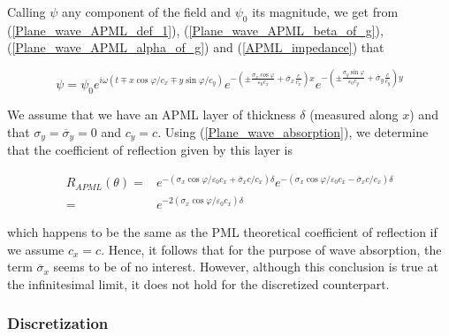 Calling $\psi$ any component of the field and $\psi _{0}$
its magnitude, we get from (\ref{Plane_wave_APML_def_1}), (\ref{Plane_wave_APML_beta_of_g}),
(\ref{Plane_wave_APML_alpha_of_g}) and (\ref{APML_impedance}) that 

\begin{equation}
\label{Plane_wave_absorption}
\psi =\psi _{0}e^{i\omega \left( t\mp x\cos \varphi /c_{x}\mp y\sin \varphi /c_{y}\right) }e^{-\left( \pm \frac{\sigma _{x}\cos \varphi }{\varepsilon _{0}c_{x}}+\overline{\sigma }_{x}\frac{c}{c_{x}}\right) x}e^{-\left( \pm \frac{\sigma _{y}\sin \varphi }{\varepsilon _{0}c_{y}}+\overline{\sigma }_{y}\frac{c}{c_{y}}\right) y}
\end{equation}


We assume that we have an APML layer of thickness $\delta$ (measured
along $x$) and that $\sigma _{y}=\overline{\sigma }_{y}=0$
and $c_{y}=c.$ Using (\ref{Plane_wave_absorption}), we determine
that the coefficient of reflection given by this layer is 

\begin{eqnarray}
R_{APML}\left( \theta \right)  = & e^{-\left( \sigma _{x}\cos \varphi /\varepsilon _{0}c_{x}+\overline{\sigma }_{x}c/c_{x}\right) \delta }e^{-\left( \sigma _{x}\cos \varphi /\varepsilon _{0}c_{x}-\overline{\sigma }_{x}c/c_{x}\right) \delta }\nonumber \\
 = & e^{-2\left( \sigma _{x}\cos \varphi /\varepsilon _{0}c_{x}\right) \delta }
\end{eqnarray}


which happens to be the same as the PML theoretical coefficient of
reflection if we assume $c_{x}=c$. Hence, it follows that for
the purpose of wave absorption, the term $\overline{\sigma }_{x}$
seems to be of no interest. However, although this conclusion is true
at the infinitesimal limit, it does not hold for the discretized counterpart.

\subsubsection{Discretization}

